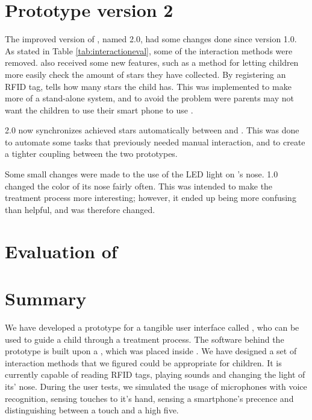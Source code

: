 \section{Prototype version 2}
\label{sec:abversion2}
The improved version of \ab{}, named \ab{} 2.0, had some changes done since version 1.0. As stated in Table \ref{tab:interactioneval}, some of the interaction methods were removed. \ab{} also received some new features, such as a method for letting children more easily check the amount of stars they have collected. By registering an RFID tag, \ab{} tells how many stars the child has. This was implemented to make \ab{} more of a stand-alone system, and to avoid the problem were parents may not want the children to use their smart phone to use \app{}. 

\ab{} 2.0 now synchronizes achieved stars automatically between \app{} and \ab{}. This was done to automate some tasks that previously needed manual interaction, and to create a tighter coupling between the two prototypes. 

Some small changes were made to the use of the LED light on \ab{}'s nose. \ab{} 1.0 changed the color of its nose fairly often. This was intended to make the treatment process more interesting; however, it ended up being more confusing than helpful, and was therefore changed. 


\section{Evaluation of \ab{}}

\section{Summary}
We have developed a prototype for a tangible user interface called \ab{}, who can be used to guide a child through a treatment process. The software behind the prototype is built upon a \rpi{}, which was placed inside \ab{}. We have designed a set of interaction methods that we figured could be appropriate for children. It is currently capable of reading RFID tags, playing sounds and changing the light of its' nose. During the user tests, we simulated the usage of microphones with voice recognition, sensing touches to it's hand, sensing a smartphone's precence and distinguishing between a touch and a high five.    